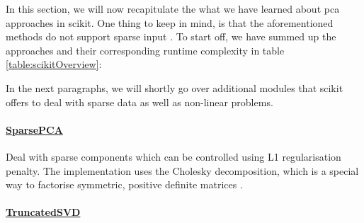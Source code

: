 In this section, we will now recapitulate the what we have learned about \acrlong{pca} approaches in \gls{scikit}.
One thing to keep in mind, is that the aforementioned methods do not support sparse input \cite{scikit-learn}.
To start off, we have summed up the approaches and their corresponding runtime complexity in table \ref{table:scikitOverview}:

\begin{table}[h]
	\centering
	\caption{Overview of \gls{scikit}'s \gls{pca} implementations}
	\label{table:scikitOverview}
\end{table}
\medskip



In the next paragraphs, we will shortly go over additional modules that \gls{scikit} offers to deal with sparse data as well as non-linear problems.

\paragraph{\href{https://scikit-learn.org/stable/modules/generated/sklearn.decomposition.SparsePCA.html\#sklearn.decomposition.SparsePCA}{SparsePCA}}

Deal with sparse components which can be controlled using L1 regularisation penalty.
The implementation uses the Cholesky decomposition, which is a special way to factorise symmetric, positive definite matrices \cite{deisenroth2020mathematics}.


\paragraph{\href{https://scikit-learn.org/stable/modules/generated/sklearn.decomposition.TruncatedSVD.html\#sklearn.decomposition.TruncatedSVD}{TruncatedSVD}}

